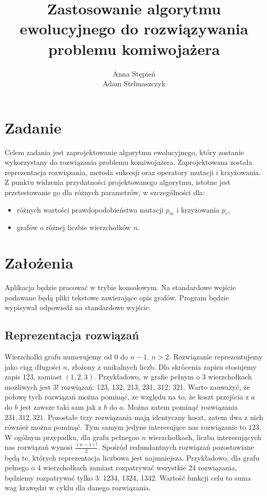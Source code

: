 \documentclass[12pt, a4paper]{article}
\title{\textbf{Zastosowanie algorytmu ewolucyjnego do rozwiązywania problemu komiwojażera}}
\author{Anna Stępień \\ Adam Stelmaszczyk}
\date{}
\begin{document}
\maketitle

\section{Zadanie}
Celem zadania jest zaprojektowanie algorytmu ewolucyjnego, który zostanie wykorzystany do rozwiązania problemu komiwojażera.
Zaprojektowana została reprezentacja rozwiązania, metoda sukcesji oraz operatory mutacji i krzyżowania. 
Z punktu widzenia przydatności projektowanego algorytmu, istotne jest przetestowanie go dla różnych parametrów, w szczególności dla:
\begin{itemize}
	\item różnych wartości prawdopodobieństwa mutacji $p_m$ i krzyżowania $p_c$,
	\item grafów o różnej liczbie wierzchołków $n$.
\end{itemize}

\section{Założenia}
Aplikacja będzie pracować w trybie konsolowym. Na standardowe wejście podawane będą pliki tekstowe zawierające opis grafów.
Program będzie wypisywał odpowiedź na standardowe wyjście.

\subsection{Reprezentacja rozwiązań}

Wierzchołki grafu numerujemy od 0 do $n - 1$. $n > 2$. Rozwiązanie reprezentujemy jako ciąg długości $n$, złożony z unikalnych liczb. 
Dla skrócenia zapisu stosujemy zapis 123, zamiast $(1,2,3)$. Przykładowo, w grafie pełnym o 3 wierzchołkach możliwych jest $3!$ rozwiązań: 123, 132, 213, 231, 312, 321.
Warto zauważyć, że połowę tych rozwiązań można pominąć, ze względu na to, że koszt przejścia z $a$ do $b$ jest zawsze 
taki sam jak z $b$ do $a$. Można zatem pominąć rozwiązania $231, 312, 321$. Pozostałe trzy rozwiązania mają identyczny koszt,
zatem dwa z nich również można pominąć. Tym samym jedyne interesujące nas rozwiązanie to $123$.
W ogólnym przypadku, dla grafu pełnegoo $n$ wierzchołkach, liczba interesujących nas rozwiązań wynosi $\frac{(n-1)!}{2}$. Spośród redundantnych rozwiązań pozostawiane będą te,
których reprezentacja liczbowa jest najmniejsza. Przykładowo, dla grafu pełnego o $4$ wierzchołkach zamiast rozpatrywać wszystkie
24 rozwiązania, będziemy rozpatrywać tylko 3: 1234, 1324, 1342. 
Wartość funkcji celu to suma wag krawędzi w cyklu dla danego rozwiązania.
\end{document}
